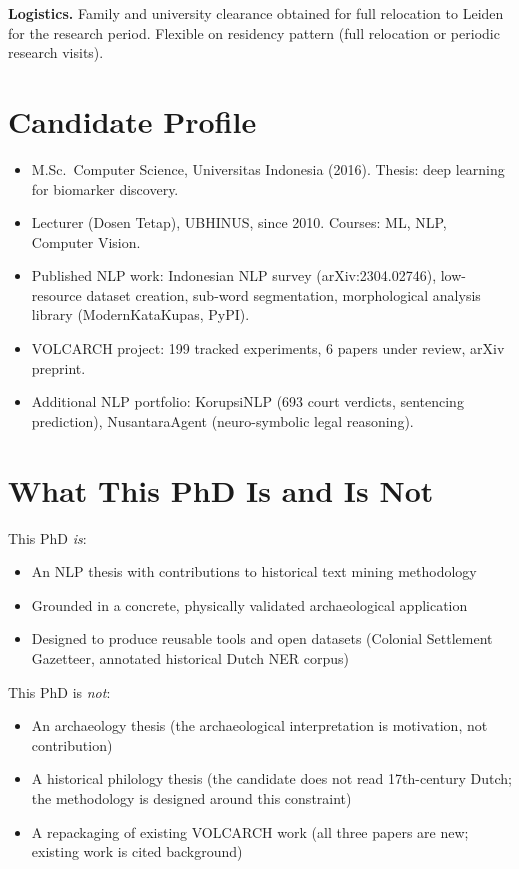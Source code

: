 \documentclass[11pt,a4paper]{article}
\begin{document}
\textbf{Logistics.} Family and university clearance obtained for full relocation to Leiden for the research period. Flexible on residency pattern (full relocation or periodic research visits).

\section{Candidate Profile}

\begin{itemize}[nosep]
  \item M.Sc.\ Computer Science, Universitas Indonesia (2016). Thesis: deep learning for biomarker discovery.
  \item Lecturer (Dosen Tetap), UBHINUS, since 2010. Courses: ML, NLP, Computer Vision.
  \item Published NLP work: Indonesian NLP survey (arXiv:2304.02746), low-resource dataset creation, sub-word segmentation, morphological analysis library (ModernKataKupas, PyPI).
  \item VOLCARCH project: 199 tracked experiments, 6 papers under review, arXiv preprint.
  \item Additional NLP portfolio: KorupsiNLP (693 court verdicts, sentencing prediction), NusantaraAgent (neuro-symbolic legal reasoning).
\end{itemize}

\section{What This PhD Is and Is Not}

This PhD \emph{is}:
\begin{itemize}[nosep]
  \item An NLP thesis with contributions to historical text mining methodology
  \item Grounded in a concrete, physically validated archaeological application
  \item Designed to produce reusable tools and open datasets (Colonial Settlement Gazetteer, annotated historical Dutch NER corpus)
\end{itemize}

This PhD is \emph{not}:
\begin{itemize}[nosep]
  \item An archaeology thesis (the archaeological interpretation is motivation, not contribution)
  \item A historical philology thesis (the candidate does not read 17th-century Dutch; the methodology is designed around this constraint)
  \item A repackaging of existing VOLCARCH work (all three papers are new; existing work is cited background)
\end{itemize}
\end{document}
